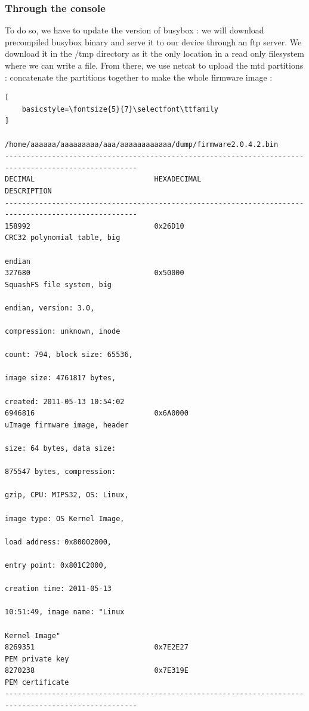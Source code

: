 \documentclass{article}
\begin{document}
\subsubsection{Through the console}
To do so, we have to update the version of busybox : we will download precompiled busybox binary and serve it to our device through an ftp server. We download it in the /tmp directory as it the only location in a read only filesystem where we can write a file. From there, we use netcat to upload the mtd partitions : concatenate the partitions together to make the whole firmware image :

\begin{lstlisting}[
    basicstyle=\fontsize{5}{7}\selectfont\ttfamily
]
                  /home/aaaaaa/aaaaaaaaa/aaa/aaaaaaaaaaaa/dump/firmware2.0.4.2.bin
-----------------------------------------------------------------------------------------------------
DECIMAL                            HEXADECIMAL                        DESCRIPTION
-----------------------------------------------------------------------------------------------------
158992                             0x26D10                            CRC32 polynomial table, big 
                                                                      endian
327680                             0x50000                            SquashFS file system, big 
                                                                      endian, version: 3.0, 
                                                                      compression: unknown, inode 
                                                                      count: 794, block size: 65536, 
                                                                      image size: 4761817 bytes, 
                                                                      created: 2011-05-13 10:54:02
6946816                            0x6A0000                           uImage firmware image, header 
                                                                      size: 64 bytes, data size: 
                                                                      875547 bytes, compression: 
                                                                      gzip, CPU: MIPS32, OS: Linux, 
                                                                      image type: OS Kernel Image, 
                                                                      load address: 0x80002000, 
                                                                      entry point: 0x801C2000, 
                                                                      creation time: 2011-05-13 
                                                                      10:51:49, image name: "Linux 
                                                                      Kernel Image"
8269351                            0x7E2E27                           PEM private key
8270238                            0x7E319E                           PEM certificate
-----------------------------------------------------------------------------------------------------
\end{lstlisting}
\end{document}
